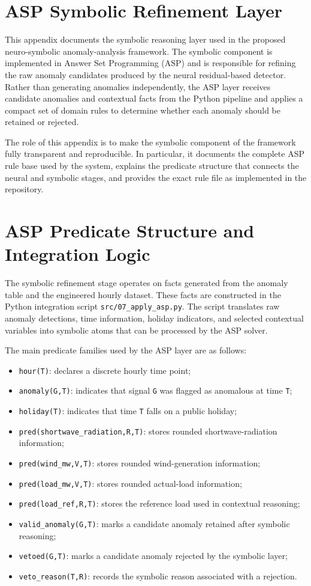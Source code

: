 
\section{ASP Symbolic Refinement Layer}
This appendix documents the symbolic reasoning layer used in the proposed neuro-symbolic anomaly-analysis framework. The symbolic component is implemented in Answer Set Programming (ASP) and is responsible for refining the raw anomaly candidates produced by the neural residual-based detector. Rather than generating anomalies independently, the ASP layer receives candidate anomalies and contextual facts from the Python pipeline and applies a compact set of domain rules to determine whether each anomaly should be retained or rejected.

The role of this appendix is to make the symbolic component of the framework fully transparent and reproducible. In particular, it documents the complete ASP rule base used by the system, explains the predicate structure that connects the neural and symbolic stages, and provides the exact rule file as implemented in the repository.

\section{ASP Predicate Structure and Integration Logic}

The symbolic refinement stage operates on facts generated from the anomaly table and the engineered hourly dataset. These facts are constructed in the Python integration script \texttt{src/07\_apply\_asp.py}. The script translates raw anomaly detections, time information, holiday indicators, and selected contextual variables into symbolic atoms that can be processed by the ASP solver.

The main predicate families used by the ASP layer are as follows:
\begin{itemize}
	\item \texttt{hour(T)}: declares a discrete hourly time point;
	\item \texttt{anomaly(G,T)}: indicates that signal \texttt{G} was flagged as anomalous at time \texttt{T};
	\item \texttt{holiday(T)}: indicates that time \texttt{T} falls on a public holiday;
	\item \texttt{pred(shortwave\_radiation,R,T)}: stores rounded shortwave-radiation information;
	\item \texttt{pred(wind\_mw,V,T)}: stores rounded wind-generation information;
	\item \texttt{pred(load\_mw,V,T)}: stores rounded actual-load information;
	\item \texttt{pred(load\_ref,R,T)}: stores the reference load used in contextual reasoning;
	\item \texttt{valid\_anomaly(G,T)}: marks a candidate anomaly retained after symbolic reasoning;
	\item \texttt{vetoed(G,T)}: marks a candidate anomaly rejected by the symbolic layer;
	\item \texttt{veto\_reason(T,R)}: records the symbolic reason associated with a rejection.
\end{itemize}

